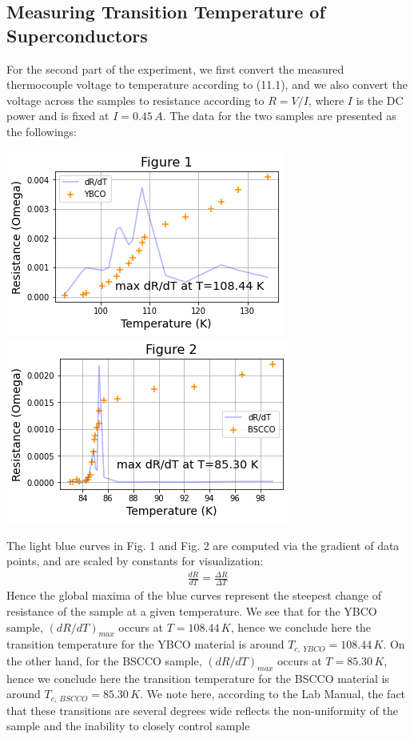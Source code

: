 \documentclass[11pt]{book}
\theoremstyle{break}
\theoremstyle{break}
\begin{document}
\subsection{Measuring Transition Temperature of Superconductors}
For the second part of the experiment, we first convert the measured thermocouple voltage to temperature according to (11.1), and we also convert the voltage across the samples to resistance according to $R = V/I$, where $I$ is the DC power and is fixed at $I = 0.45\, A$. The data for the two samples are presented as the followings:
\begin{center}
\includegraphics[scale=0.6]{1}
\includegraphics[scale=0.6]{2}
\end{center}
The light blue curves in Fig. 1 and Fig. 2 are computed via the gradient of data points, and are scaled by constants for visualization:
\begin{align*}
\frac{dR}{dT} = \frac{\Delta R}{\Delta T}
\end{align*}
Hence the global maxima of the blue curves represent the steepest change of resistance of the sample at a given temperature. We see that for the YBCO sample, $(dR/dT)_{max}$ occurs at $T = 108.44\, K$, hence we conclude here the transition temperature for the YBCO material is around $T_{c,\ YBCO} = 108.44\, K$. On the other hand, for the BSCCO sample, $(dR/dT)_{max}$ occurs at $T = 85.30\, K$, hence we conclude here the transition temperature for the BSCCO material is around $T_{c,\ BSCCO} = 85.30\, K$. We note here, according to the Lab Manual, the fact that these transitions are several degrees wide reflects the non-uniformity of the sample and the inability to closely control sample 
\end{document}

